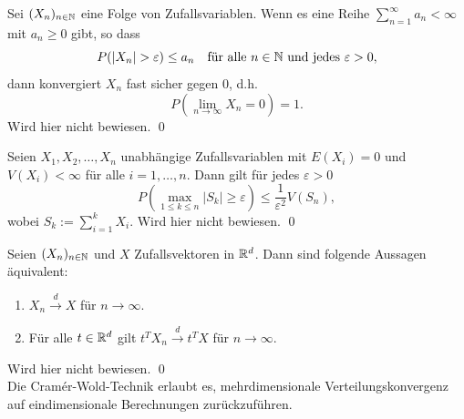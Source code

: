 \begin{lemma}
Sei $(X_n)_{n \in \Bbb N}$ eine Folge von Zufallsvariablen. Wenn es eine Reihe $\sum_{n=1}^\infty a_n \lt \infty$ mit $a_n \geq 0$ gibt, so dass
$$P(|X_n| > \varepsilon) \leq a_n \quad \text{für alle } n \in \Bbb N \text{ und jedes } \varepsilon > 0,$$
dann konvergiert $X_n$ fast sicher gegen $0$, d.h.
$$P\left(\lim_{n \to \infty} X_n = 0\right) = 1.$$
Wird hier nicht bewiesen. \qed
\end{lemma}

\begin{satz}
Seien $X_1, X_2, \ldots, X_n$ unabhängige Zufallsvariablen mit $E(X_i) = 0$ und $V(X_i) < \infty$ für alle $i=1, \ldots, n$. Dann gilt für jedes $\varepsilon > 0$
$$P\left(\max_{1 \leq k \leq n} |S_k| \geq \varepsilon \right) \leq \frac{1}{\varepsilon^2} V(S_n),$$
wobei $S_k := \sum_{i=1}^k X_i$. Wird hier nicht bewiesen. \qed
\end{satz}

\begin{satz}
Seien $(X_n)_{n \in \Bbb N}$ und $X$ Zufallsvektoren in $\Bbb R^d$. Dann sind folgende Aussagen äquivalent:
\begin{enumerate}
    \item $X_n \xrightarrow{d} X$ für $n \to \infty$.
    \item Für alle $t \in \Bbb R^d$ gilt $t^T X_n \xrightarrow{d} t^T X$ für $n \to \infty$.
\end{enumerate}
Wird hier nicht bewiesen. \qed \\
Die Cramér-Wold-Technik erlaubt es, mehrdimensionale Verteilungskonvergenz auf eindimensionale Berechnungen zurückzuführen.
\end{satz}

